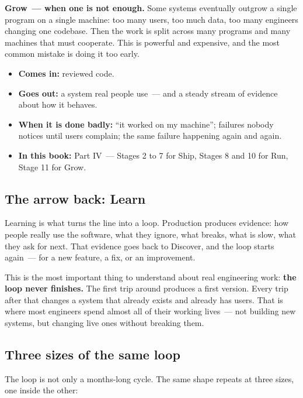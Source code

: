 \textbf{Grow~--- when one is not enough.} Some systems eventually outgrow a single program on a single machine: too many users, too much data, too many engineers changing one codebase. Then the work is split across many programs and many machines that must cooperate. This is powerful and expensive, and the most common mistake is doing it too early.

\begin{itemize}
\tightlist
\item
  \textbf{Comes in:} reviewed code.
\item
  \textbf{Goes out:} a system real people use~--- and a steady stream of evidence about how it behaves.
\item
  \textbf{When it is done badly:} ``it worked on my machine''; failures nobody notices until users complain; the same failure happening again and again.
\item
  \textbf{In this book:} Part IV~--- Stages 2 to 7 for Ship, Stages 8 and 10 for Run, Stage 11 for Grow.
\end{itemize}

\subsection*{The arrow back: Learn}\label{how-software-gets-built:the-arrow-back-learn}

Learning is what turns the line into a loop. Production produces evidence: how people really use the software, what they ignore, what breaks, what is slow, what they ask for next. That evidence goes back to Discover, and the loop starts again~--- for a new feature, a fix, or an improvement.

This is the most important thing to understand about real engineering work: \textbf{the loop never finishes.} The first trip around produces a first version. Every trip after that changes a system that already exists and already has users. That is where most engineers spend almost all of their working lives~--- not building new systems, but changing live ones without breaking them.

\subsection*{Three sizes of the same loop}\label{how-software-gets-built:three-sizes-of-the-same-loop}

The loop is not only a months-long cycle. The same shape repeats at three sizes, one inside the other:

